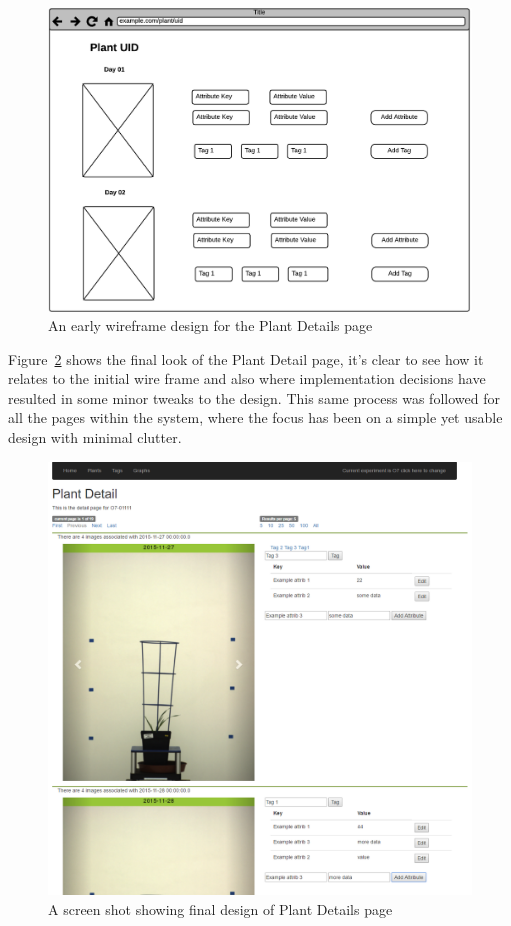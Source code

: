 \begin{figure}[H]
    \centering
    \includegraphics[width=\textwidth]{images/design/ui1}
    \caption{An early wireframe design for the Plant Details page}
    \label{fig:ui1}
\end{figure}

Figure~\ref{fig:ui2} shows the final look of the Plant Detail page, it's clear to see how it relates to the initial wire frame and also where implementation decisions have resulted in some minor tweaks to the design. This same process was followed for all the pages within the system, where the focus has been on a simple yet usable design with minimal clutter.

\begin{figure}[H]
    \centering
    \includegraphics[width=\textwidth]{images/design/ui2}
    \caption{A screen shot showing final design of Plant Details page}
    \label{fig:ui2}
\end{figure}



